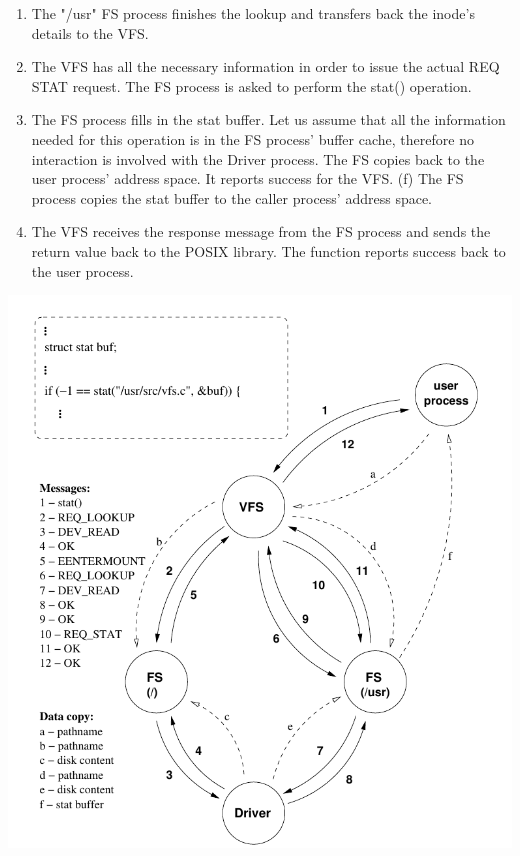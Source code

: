 \begin{enumerate}
\item The "/usr" FS process finishes the lookup and transfers back the inode’s details to the VFS.

\item The VFS has all the necessary information in order to issue the actual REQ STAT request. The FS process is asked to perform the stat() operation.

\item The FS process fills in the stat buffer. Let us assume that all the information needed for this operation is in the FS process’ buffer cache, therefore no interaction is involved with the Driver process. The FS copies back to the user process’ address space. It reports success for the VFS.
    (f) The FS process copies the stat buffer to the caller process’ address space.

\item The VFS receives the response message from the FS process and sends the return value back to the POSIX library. The function reports success back to the user process.

\end{enumerate}
    
\includegraphics[scale=0.7]{./pics/vfsflow.png}

